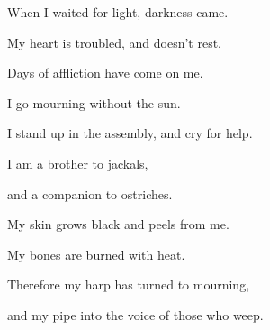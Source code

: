 {\par }{\QB When I waited for light, darkness came.
\par }{\Q {}My heart is troubled, and doesn’t rest.
\par }{\QB Days of affliction have come on me.
\par }{\Q {}I go mourning without the sun.
\par }{\QB I stand up in the assembly, and cry for help.
\par }{\Q {}I am a brother to jackals,
\par }{\QB and a companion to ostriches.
\par }{\Q {}My skin grows black and peels from me.
\par }{\QB My bones are burned with heat.
\par }{\Q {}Therefore my harp has turned to mourning,
\par }{\QB and my pipe into the voice of those who weep.
\par }{\BB \par }
